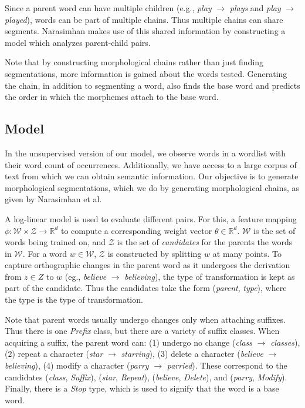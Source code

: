 \documentclass[11pt,twocolumn]{article}
\begin{document}
Since a parent word can have multiple children (e.g., \emph{play} $\rightarrow$ \emph{plays} and \emph{play} $\rightarrow$ \emph{played}), words can be part of multiple chains. Thus multiple chains can share segments. Narasimhan makes use of this shared information by constructing a model which analyzes parent-child pairs.

Note that by constructing morphological chains rather than just finding segmentations, more information is gained about the words tested. Generating the chain, in addition to segmenting a word, also finds the base word and predicts the order in which the morphemes attach to the base word.

\subsection{Model}

In the unsupervised version of our model, we observe words in a wordlist with their word count of occurrences. Additionally, we have access to a large corpus of text from which we can obtain semantic information. Our objective is to generate morphological segmentations, which we do by generating morphological chains, as given by Narasimhan et al.

A log-linear model is used to evaluate different pairs. For this, a feature mapping $\phi: \mathcal W \times \mathcal Z \rightarrow \mathbb R^d$ to compute a corresponding weight vector $\theta\in\mathbb R^d$. $\mathcal W$ is the set of words being trained on, and $\mathcal Z$ is the set of \emph{candidates} for the parents the words in $\mathcal W$. For a word $w\in\mathcal W$, $\mathcal Z$ is constructed by splitting $w$ at many points. To capture orthographic changes in the parent word as it undergoes the derivation from $z\in Z$ to $w$ (eg., \emph{believe} $\rightarrow$ \emph{believing}), the type of transformation is kept as part of the candidate. Thus the candidates take the form (\emph{parent}, \emph{type}), where the type is the type of transformation.

Note that parent words usually undergo changes only when attaching suffixes. Thus there is one \emph{Prefix} class, but there are a variety of suffix classes. When acquiring a suffix, the parent word can: (1) undergo no change (\emph{class} $\rightarrow$ \emph{classes}), (2) repeat a character (\emph{star} $\rightarrow$ \emph{starring}), (3) delete a character (\emph{believe} $\rightarrow$ \emph{believing}), (4) modify a character (\emph{parry} $\rightarrow$ \emph{parried}). These correspond to the candidates (\emph{class}, \emph{Suffix}), (\emph{star}, \emph{Repeat}), (\emph{believe}, \emph{Delete}), and (\emph{parry}, \emph{Modify}). Finally, there is a \emph{Stop} type, which is used to signify that the word is a base word.
\end{document}
